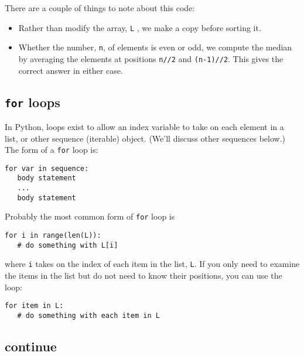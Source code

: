 There are a couple of things to
note about this code:

\begin{itemize}

\item
  Rather than modify the array, \texttt{L} , we make a copy before sorting it.
\item
  Whether the number, \texttt{n}, of
  elements is even or odd, we compute the median by averaging the
  elements at positions \texttt{n//2} and \texttt{(n-1)//2}. This gives the
  correct answer in either case.
\end{itemize}

\subsection{\texttt{for} loops}

In Python, loops exist
to allow an index variable to take on each element in a list, or other
sequence (iterable) object. (We'll discuss other sequences below.) The form of a
\texttt{for} loop is:

\begin{verbatim}
for var in sequence:
   body statement
   ...
   body statement  
\end{verbatim}

Probably the most common form of \texttt{for} loop is

\begin{verbatim}
for i in range(len(L)):
   # do something with L[i]  
\end{verbatim}

where \texttt{i} takes on the index
of each item in the list, \texttt{L}. If you only need to examine the
items in the list but do not need to know their positions, you can use
the loop:

\begin{verbatim}
for item in L:
   # do something with each item in L
\end{verbatim}

\subsection{continue}

\endinput

If you decide that you are finished
with the current iteration of a loop, you can execute the continue
statement. It consists of the single word

continue

